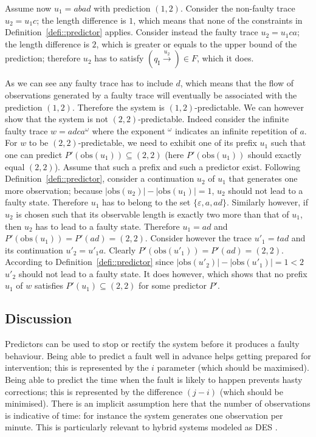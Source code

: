 \documentclass{article}
\newcommand{\qi}[0]{q_{\mathrm{I}}}
\newcommand{\trans}[1]{\stackrel{#1}{\rightarrow}}
\newcommand{\obs}[0]{\mathrm{obs}}
\newcommand{\set}[1]{\{#1\}}
\begin{document}
Assume now $u_1 = abad$ with prediction $(1,2)$.  
Consider the non-faulty trace $u_2 = u_1c$; 
the length difference is $1$, 
which means that none of the constraints 
in Definition~\ref{defi::predictor} applies.  
Consider instead the faulty trace $u_2 = u_1ca$; 
the length difference is $2$, 
which is greater or equals to the upper bound of the prediction; 
therefore $u_2$ has to satisfy $(\qi \trans{u_2}) \in F$, 
which it does.  

As we can see any faulty trace has to include $d$, 
which means that the flow of observations generated by a faulty trace 
will eventually be associated with the prediction $(1,2)$.  
Therefore the system is $(1,2)$-predictable.  
We can however show that the system is not $(2,2)$-predictable.  
Indeed consider the infinite faulty trace $w = adca^\omega$ 
where the exponent $^\omega$ indicates an infinite repetition of $a$.  
For $w$ to be $(2,2)$-predictable, 
we need to exhibit one of its prefix $u_1$ 
such that one can predict $P'(\obs(u_1)) \subseteq (2,2)$ 
(here $P'(\obs(u_1))$ should exactly equal $(2,2)$).  
Assume that such a prefix and such a predictor exist.  
Following Definition~\ref{defi::predictor}, 
consider a continuation $u_2$ of $u_1$ 
that generates one more observation; 
because $|\obs(u_2)| - |\obs(u_1)| = 1$, 
$u_2$ should not lead to a faulty state.  
Therefore $u_1$ has to belong to the set 
$\set{\varepsilon, a, ad}$.  
Similarly however, if $u_2$ is chosen such that its observable length 
is exactly two more than that of $u_1$, 
then $u_2$ has to lead to a faulty state.  
Therefore $u_1 = ad$ and $P'(\obs(u_1)) = P'(ad) = (2,2)$.  
Consider however the trace $u'_1 = tad$ 
and its continuation $u'_2 = u'_1 a$.  
Clearly $P'(\obs(u'_1)) = P'(ad) = (2,2)$.  
According to Definition~\ref{defi::predictor} 
since $|\obs(u'_2)| - |\obs(u'_1)| = 1 < 2$ 
$u'_2$ should not lead to a faulty state.  
It does however, which shows that no prefix $u_1$ of $w$ 
satisfies $P'(u_1) \subseteq (2,2)$ for some predictor $P'$.  

\subsection{Discussion}

Predictors can be used to stop or rectify the system 
before it produces a faulty behaviour.  
Being able to predict a fault well in advance 
helps getting prepared for intervention; 
this is represented by the $i$ parameter (which should be maximised).  
Being able to predict the time when the fault is likely to happen 
prevents hasty corrections; 
this is represented by the difference $(j-i)$ 
(which should be minimised).  
There is an implicit assumption here 
that the number of observations is indicative of time: 
for instance the system generates one observation per minute.  
This is particularly relevant to hybrid systems modeled as DES 
\cite{vento-etal::tsmc::15}.  
\end{document}
